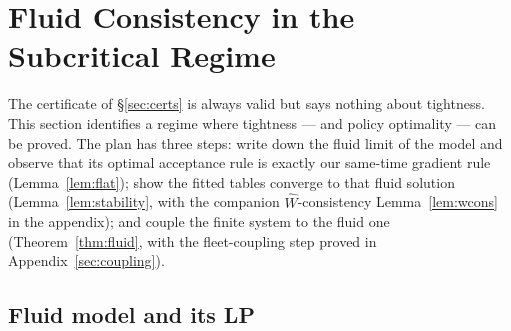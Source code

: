 \documentclass[11pt]{article}
\begin{document}
\section{Fluid Consistency in the Subcritical Regime}
\label{sec:fluid}

The certificate of \S\ref{sec:certs} is always valid but says nothing
about tightness. This section identifies a regime where tightness ---
and policy optimality --- can be proved. The plan has three steps:
write down the fluid limit of the model and observe that its optimal
acceptance rule is exactly our same-time gradient rule
(Lemma~\ref{lem:flat}); show the fitted tables converge to that fluid
solution (Lemma~\ref{lem:stability}, with the companion
$\widehat{W}$-consistency Lemma~\ref{lem:wcons} in the appendix); and couple
the finite system to the fluid one (Theorem~\ref{thm:fluid}, with the
fleet-coupling step proved in Appendix~\ref{sec:coupling}).

\subsection{Fluid model and its LP}
\end{document}
